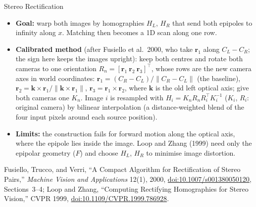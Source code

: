 \begin{frame}{Stereo Rectification}
  \begin{itemize}\scriptsize\itemsep0.15em
    \item \textbf{Goal:} warp both images by homographies $H_L$, $H_R$ that send both epipoles to infinity along $x$. Matching then becomes a 1D scan along one row.
    \item \textbf{Calibrated method} (after Fusiello et al.\ 2000, who take $\mathbf{r}_1$ along $C_L-C_R$; the sign here keeps the images upright): keep both centres and rotate both cameras to one orientation $R_n=[\mathbf{r}_1\ \mathbf{r}_2\ \mathbf{r}_3]^\top$, whose rows are the new camera axes in world coordinates: $\mathbf{r}_1 = (C_R-C_L)/\lVert C_R-C_L\rVert$ (the baseline), $\mathbf{r}_2 = \mathbf{k}\times\mathbf{r}_1/\lVert\mathbf{k}\times\mathbf{r}_1\rVert$, $\mathbf{r}_3 = \mathbf{r}_1\times\mathbf{r}_2$, where $\mathbf{k}$ is the old left optical axis; give both cameras one $K_n$. Image $i$ is resampled with $H_i = K_n R_n R_i^\top K_i^{-1}$ ($K_i$, $R_i$: original camera) by bilinear interpolation (a distance-weighted blend of the four input pixels around each source position).
    \item \textbf{Limits:} the construction fails for forward motion along the optical axis, where the epipole lies inside the image. Loop and Zhang (1999) need only the epipolar geometry ($F$) and choose $H_L$, $H_R$ to minimise image distortion.
  \end{itemize}
  \vspace{0.1em}
  {\scriptsize Fusiello, Trucco, and Verri, ``A Compact Algorithm for Rectification of Stereo Pairs,'' \textit{Machine Vision and Applications} 12(1), 2000, \href{https://doi.org/10.1007/s001380050120}{doi:10.1007/s001380050120}, Sections~3--4; Loop and Zhang, ``Computing Rectifying Homographies for Stereo Vision,'' CVPR 1999, \href{https://doi.org/10.1109/CVPR.1999.786928}{doi:10.1109/CVPR.1999.786928}.\par}
\end{frame}

